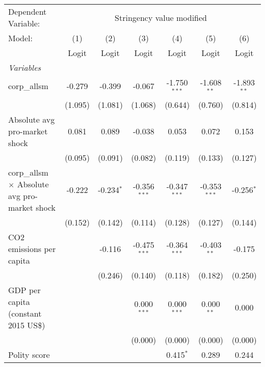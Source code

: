 
\begingroup
\centering
\begin{tabular}{lcccccc}
   \toprule
   Dependent Variable: & \multicolumn{6}{c}{Stringency value modified}\\
   Model:                                               & (1)     & (2)          & (3)            & (4)            & (5)            & (6)\\  
                                                        &  Logit  & Logit        & Logit          & Logit          & Logit          & Logit\\  
   \midrule
   \emph{Variables}\\
   corp\_allsm                                          & -0.279  & -0.399       & -0.067         & -1.750$^{***}$ & -1.608$^{**}$  & -1.893$^{**}$\\   
                                                        & (1.095) & (1.081)      & (1.068)        & (0.644)        & (0.760)        & (0.814)\\   
   Absolute avg pro-market shock                        & 0.081   & 0.089        & -0.038         & 0.053          & 0.072          & 0.153\\   
                                                        & (0.095) & (0.091)      & (0.082)        & (0.119)        & (0.133)        & (0.127)\\   
   corp\_allsm $\times$ Absolute avg pro-market shock   & -0.222  & -0.234$^{*}$ & -0.356$^{***}$ & -0.347$^{***}$ & -0.353$^{***}$ & -0.256$^{*}$\\   
                                                        & (0.152) & (0.142)      & (0.114)        & (0.128)        & (0.127)        & (0.144)\\   
   CO2 emissions per capita                             &         & -0.116       & -0.475$^{***}$ & -0.364$^{***}$ & -0.403$^{**}$  & -0.175\\   
                                                        &         & (0.246)      & (0.140)        & (0.118)        & (0.182)        & (0.250)\\   
   GDP per capita (constant 2015 US\$)                  &         &              & 0.000$^{***}$  & 0.000$^{***}$  & 0.000$^{**}$   & 0.000\\   
                                                        &         &              & (0.000)        & (0.000)        & (0.000)        & (0.000)\\   
   Polity score                                         &         &              &                & 0.415$^{*}$    & 0.289          & 0.244\\   

\end{tabular}
